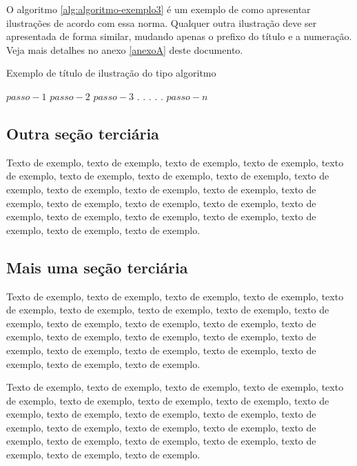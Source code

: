 \documentclass[
	12pt,				%
	oneside,			%
	a4paper,			%
	english,			%
	brazil				%
	]{abntex2ppgsi}
\begin{document}
O algoritmo \ref{alg:algoritmo-exemplo3} é um exemplo de como apresentar ilustrações de acordo com essa norma. Qualquer outra ilustração deve ser apresentada de forma similar, mudando apenas o prefixo do título e a numeração. Veja mais detalhes no anexo \ref{anexoA} deste documento.

\begin{algorithm}[htbp]
\caption{Exemplo de título de ilustração do tipo algoritmo}
\label{alg:algoritmo-exemplo3}
\begin{algorithmic}[1]
\State $passo-1$
\State $passo-2$
\State $passo-3$
\State $.$
\State $.$
\State $.$
\State $.$
\State $.$
\State $passo-n$
\EndProcedure
\end{algorithmic}
\end{algorithm}


\subsection{Outra seção terciária}

Texto de exemplo, texto de exemplo, texto de exemplo, texto de exemplo, texto de exemplo, texto de exemplo, texto de exemplo, texto de exemplo, texto de exemplo, texto de exemplo, texto de exemplo, texto de exemplo, texto de exemplo, texto de exemplo, texto de exemplo, texto de exemplo, texto de exemplo, texto de exemplo, texto de exemplo, texto de exemplo, texto de exemplo, texto de exemplo, texto de exemplo.

\subsection{Mais uma seção terciária}

Texto de exemplo, texto de exemplo, texto de exemplo, texto de exemplo, texto de exemplo, texto de exemplo, texto de exemplo, texto de exemplo, texto de exemplo, texto de exemplo, texto de exemplo, texto de exemplo, texto de exemplo, texto de exemplo, texto de exemplo, texto de exemplo, texto de exemplo, texto de exemplo, texto de exemplo, texto de exemplo, texto de exemplo, texto de exemplo, texto de exemplo.

Texto de exemplo, texto de exemplo, texto de exemplo, texto de exemplo, texto de exemplo, texto de exemplo, texto de exemplo, texto de exemplo, texto de exemplo, texto de exemplo, texto de exemplo, texto de exemplo, texto de exemplo, texto de exemplo, texto de exemplo, texto de exemplo, texto de exemplo, texto de exemplo, texto de exemplo, texto de exemplo, texto de exemplo, texto de exemplo, texto de exemplo.
\end{document}
